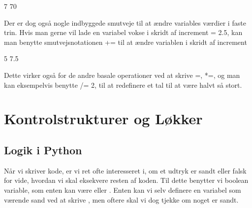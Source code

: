 \documentclass[letterpaper,10pt,english]{jupyterBook}
\begin{document}
\begin{sphinxVerbatim}[commandchars=\\\{\}]
7
70
\end{sphinxVerbatim}

Der er dog også nogle indbyggede smutveje til at ændre variables værdier i faste trin. Hvis man gerne vil lade en variabel vokse i skridt af increment = 2.5, kan man benytte smutvejs\sphinxhyphen{}notationen += til at ændre variablen i skridt af increment

\begin{sphinxVerbatim}[commandchars=\\\{\}]
  
  

   
\end{sphinxVerbatim}

\begin{sphinxVerbatim}[commandchars=\\\{\}]
5
7.5
\end{sphinxVerbatim}

Dette virker også for de andre basale operationer ved at skrive \sphinxhyphen{}=, *=, og man kan eksempelvis benytte /= 2, til at redefinere et tal til at være halvt så stort.


\section{Kontrolstrukturer og Løkker}
\label{\detokenize{notebooks/Andet_python:kontrolstrukturer-og-lokker}}\label{\detokenize{notebooks/Andet_python::doc}}


\subsection{Logik i Python}
\label{\detokenize{notebooks/Andet_python:logik-i-python}}
Når vi skriver kode, er vi ret ofte interesseret i, om et udtryk er sandt eller falsk for vide, hvordan vi skal eksekvere resten af koden. Til dette benytter vi boolean variable, som enten kan være  eller . Enten kan vi selv definere en variabel som værende sand ved at skrive , men oftere skal vi dog tjekke om noget er sandt.
\end{document}

